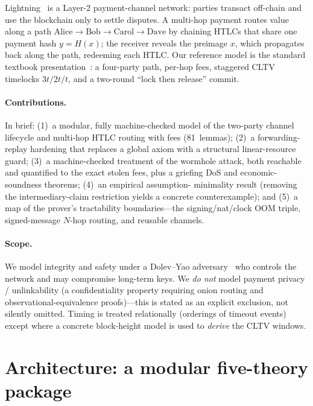 \documentclass[11pt]{article}
\begin{document}
Lightning~\cite{poon-dryja} is a Layer-2 payment-channel network: parties
transact off-chain and use the blockchain only to settle disputes. A multi-hop payment routes value
along a path $\text{Alice}\!\to\!\text{Bob}\!\to\!\text{Carol}\!\to\!\text{Dave}$
by chaining HTLCs that share one payment hash $y=H(x)$; the receiver reveals
the preimage $x$, which propagates back along the path, redeeming each HTLC.
Our reference model is the standard textbook presentation~\cite{maffei}: a
four-party path, per-hop fees, staggered CLTV timelocks $3t/2t/t$, and a
two-round ``lock then release'' commit.

\paragraph{Contributions.} In brief: (1)~a modular, fully machine-checked model
of the two-party channel lifecycle and multi-hop HTLC routing with fees
(81~lemmas); (2)~a forwarding-replay hardening that replaces a global axiom with
a structural linear-resource guard; (3)~a machine-checked treatment of the
wormhole attack, both reachable and quantified to the exact stolen fees, plus a
griefing DoS and economic-soundness theorems; (4)~an empirical assumption-%
minimality result (removing the intermediary-claim restriction yields a concrete
counterexample); and (5)~a map of the prover's tractability boundaries---the
signing/nat/clock OOM triple, signed-message $N$-hop routing, and reusable
channels.

\paragraph{Scope.} We model integrity and safety under a Dolev--Yao
adversary~\cite{dolev-yao} who controls the network and may compromise long-term keys. We \emph{do not}
model payment privacy / unlinkability (a confidentiality property requiring
onion routing and observational-equivalence proofs)---this is stated as an
explicit exclusion, not silently omitted. Timing is treated relationally
(orderings of timeout events) except where a concrete block-height model is
used to \emph{derive} the CLTV windows.

\section{Architecture: a modular five-theory package}
\label{sec:arch}
\end{document}
